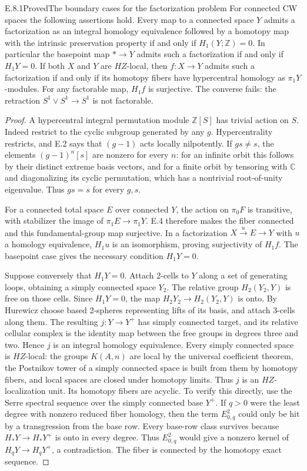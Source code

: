\begin{claim}{E.8.1}{Proved}{The boundary cases for the factorization problem}
For connected CW spaces the following assertions hold.
Every map to a connected space $Y$ admits a factorization as an
integral homology equivalence followed by a homotopy map with the
intrinsic preservation property if and only if $H_1(Y;\mathbb Z)=0$.
In particular the basepoint map $*\to Y$ admits such a factorization
if and only if $H_1Y=0$.
If both $X$ and $Y$ are $HZ$-local, then $f:X\to Y$ admits such a
factorization if and only if its homotopy fibers have hypercentral
homology as $\pi_1Y$-modules.
For any factorable map, $H_1f$ is surjective. The converse fails:
the retraction $S^1\vee S^1\to S^1$ is not factorable.
\end{claim}
\begin{proof}
A hypercentral integral permutation module $\mathbb Z[S]$ has
trivial action on $S$. Indeed restrict to the cyclic subgroup
generated by any $g$. Hypercentrality restricts, and E.2 says that
$(g-1)$ acts locally nilpotently. If $gs\ne s$, the elements
$(g-1)^n[s]$ are nonzero for every $n$: for an infinite orbit this
follows by their distinct extreme basis vectors, and for a finite
orbit by tensoring with $\mathbb C$ and diagonalizing its cyclic
permutation, which has a nontrivial root-of-unity eigenvalue.
Thus $gs=s$ for every $g,s$.

For a connected total space $E$ over connected $Y$, the action on
$\pi_0F$ is transitive, with stabilizer the image of
$\pi_1E\to\pi_1Y$. E.4 therefore makes the fiber connected and
this fundamental-group map surjective. In a factorization
$X\xrightarrow{u}E\to Y$ with $u$ a homology equivalence,
$H_1u$ is an isomorphism, proving surjectivity of $H_1f$.
The basepoint case gives the necessary condition $H_1Y=0$.

Suppose conversely that $H_1Y=0$. Attach 2-cells to $Y$ along a
set of generating loops, obtaining a simply connected space $Y_2$.
The relative group $H_2(Y_2,Y)$ is free on those cells. Since
$H_1Y=0$, the map $H_2Y_2\to H_2(Y_2,Y)$ is onto. By Hurewicz
choose based 2-spheres representing lifts of its basis, and attach
3-cells along them. The resulting $j:Y\to Y^+$ has simply
connected target, and its relative cellular complex is the identity
map between the free groups in degrees three and two. Hence $j$
is an integral homology equivalence.
Every simply connected space is $HZ$-local: the groups
$K(A,n)$ are local by the universal coefficient theorem, the
Postnikov tower of a simply connected space is built from them
by homotopy fibers, and local spaces are closed under homotopy
limits. Thus $j$ is an $HZ$-localization unit.
Its homotopy fibers are acyclic. To verify this directly, use the
Serre spectral sequence over the simply connected base $Y^+$.
If $q>0$ were the least degree with nonzero reduced fiber homology,
then the term $E^2_{0,q}$ could only be hit by a transgression
from the base row. Every base-row class survives because
$H_*Y\to H_*Y^+$ is onto in every degree. Thus $E^2_{0,q}$
would give a nonzero kernel of $H_qY\to H_qY^+$, a contradiction.
The fiber is connected by the homotopy exact sequence.


\end{proof}
